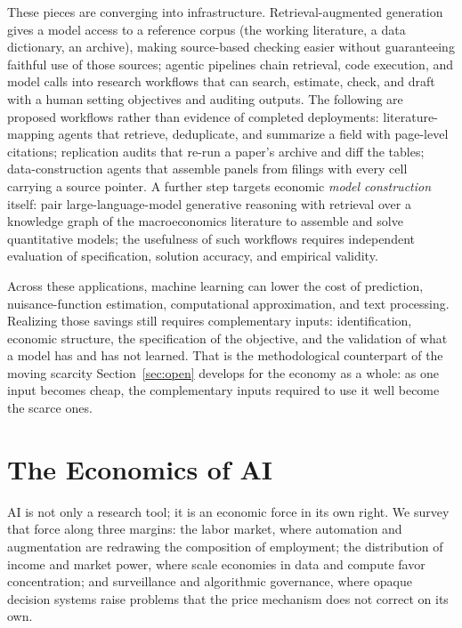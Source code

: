 \documentclass[12pt]{article}
\theoremstyle{plain}
\theoremstyle{definition}
\theoremstyle{remark}
\begin{document}
These pieces are converging into infrastructure. Retrieval-augmented
generation gives a model access to a reference corpus (the working
literature, a data dictionary, an archive), making source-based checking
easier without guaranteeing faithful use of those sources; agentic pipelines chain retrieval, code execution, and
model calls into research workflows that can search, estimate, check,
and draft with a human setting objectives and auditing outputs. The
following are proposed workflows rather than evidence of completed
deployments: literature-mapping agents that
retrieve, deduplicate, and summarize a field with page-level citations;
replication audits that re-run a paper's archive and diff the tables;
data-construction agents that assemble panels from filings with every
cell carrying a source pointer. A further step targets economic
\emph{model construction} itself: \citet{FengEtAl2026GRAM} pair
large-language-model generative reasoning with retrieval over a
knowledge graph of the macroeconomics literature to assemble and solve
quantitative models; the usefulness of such workflows requires
independent evaluation of specification, solution accuracy, and
empirical validity.

Across these applications, machine learning can lower the cost of
prediction, nuisance-function estimation, computational approximation,
and text processing. Realizing those savings still requires
complementary inputs: identification, economic structure, the
specification of the objective, and the validation of what a model has
and has not learned. That is the methodological counterpart of the
moving scarcity Section~\ref{sec:open} develops for the economy as a
whole: as one input becomes cheap, the complementary inputs required to
use it well become the scarce ones.

\section{The Economics of AI}\label{sec:econ-of-ai}

AI is not only a research tool; it is an economic force in its own right.
We survey that force along three margins: the labor market,
where automation and augmentation are redrawing the composition of
employment; the distribution of income and market power, where scale
economies in data and compute favor concentration; and surveillance and
algorithmic governance, where opaque decision systems raise problems that
the price mechanism does not correct on its own.
\end{document}
